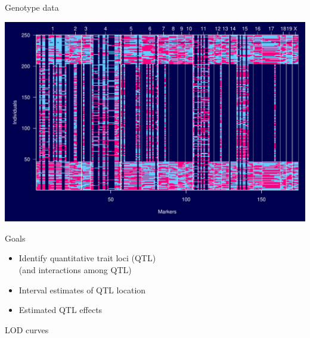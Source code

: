 \documentclass[12pt]{article}
\newcommand{\headsize}{\fontsize{35}{35} \selectfont}
\newcommand{\smallsize}{\fontsize{25}{30} \selectfont}
\begin{document}
\newpage

\headsize \color{myyellow}
\hfill \begin{minipage}{5.75in}
\centering
Genotype data
\end{minipage}

\vfill

\centerline{\includegraphics{FigsB/genodata.pdf}}


\newpage

\headsize \color{myyellow}
\hfill \begin{minipage}{5.75in}
\centering
Goals
\end{minipage}

\vspace{3cm}

\color{mywhite} \smallsize

\hfill \begin{minipage}[t]{9.5in}
\begin{itemize}
\itemsep24pt
\item Identify quantitative trait loci (QTL) \\[6pt]
   {\color{myblue}   (and interactions among QTL)}
\item Interval estimates of QTL location
\item Estimated QTL effects
\end{itemize} \end{minipage}

\newpage

\headsize \color{myyellow}
\hfill \begin{minipage}{5.75in}
\centering
LOD curves
\end{minipage}

\vfill
\end{document}
